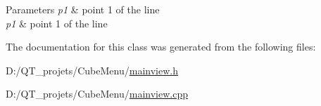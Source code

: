 \begin{DoxyParams}{Parameters}
{\em p1} & point 1 of the line \\
\hline
{\em p1} & point 1 of the line \\
\hline
\end{DoxyParams}


The documentation for this class was generated from the following files\+:\begin{DoxyCompactItemize}
\item 
D\+:/\+Q\+T\+\_\+projets/\+Cube\+Menu/\hyperlink{mainview_8h}{mainview.\+h}\item 
D\+:/\+Q\+T\+\_\+projets/\+Cube\+Menu/\hyperlink{mainview_8cpp}{mainview.\+cpp}\end{DoxyCompactItemize}
